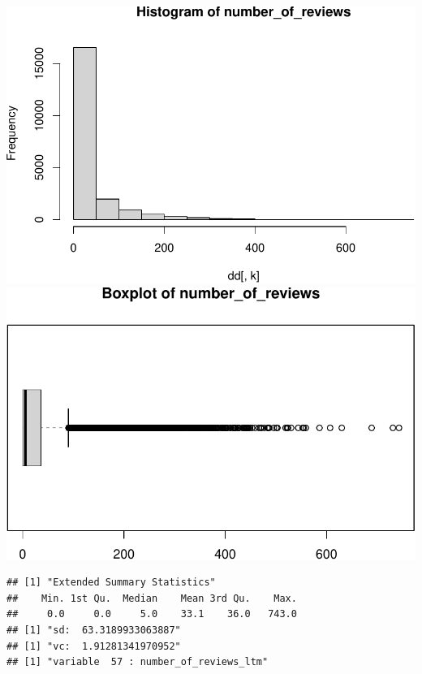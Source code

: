 \includegraphics{anal_files/figure-latex/unnamed-chunk-7-40.pdf}
\includegraphics{anal_files/figure-latex/unnamed-chunk-7-41.pdf}

\begin{verbatim}
## [1] "Extended Summary Statistics"
##    Min. 1st Qu.  Median    Mean 3rd Qu.    Max. 
##     0.0     0.0     5.0    33.1    36.0   743.0 
## [1] "sd:  63.3189933063887"
## [1] "vc:  1.91281341970952"
## [1] "variable  57 : number_of_reviews_ltm"
\end{verbatim}

